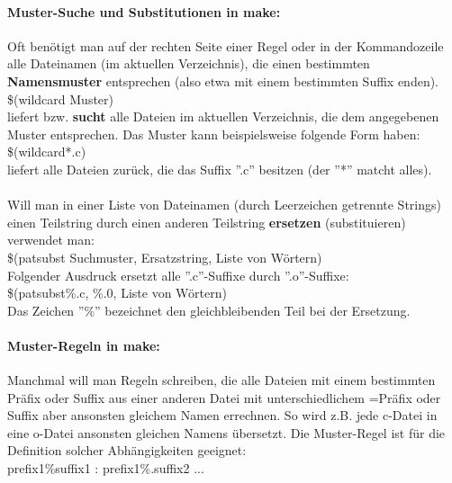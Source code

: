 \paragraph{Muster-Suche und Substitutionen in make:}
Oft benötigt man auf der rechten Seite einer Regel oder in der Kommandozeile alle Dateinamen (im aktuellen Verzeichnis), die einen bestimmten \textbf{Namensmuster} entsprechen (also etwa mit einem bestimmten Suffix enden). \\
\$(wildcard Muster) \\
liefert bzw. \textbf{sucht} alle Dateien im aktuellen Verzeichnis, die dem angegebenen Muster entsprechen. Das Muster kann beispielsweise folgende Form haben: \\
\$(wildcard*.c) \\
liefert alle Dateien zurück, die das Suffix ''.c'' besitzen (der ''*'' matcht alles). 
\\
\\
Will man in einer Liste von Dateinamen (durch Leerzeichen getrennte Strings) einen Teilstring durch einen anderen Teilstring \textbf{ersetzen} (substituieren) verwendet man: \\
\$(patsubst Suchmuster, Ersatzstring, Liste von Wörtern) \\
Folgender Ausdruck ersetzt alle ''.c''-Suffixe durch ''.o''-Suffixe: \\
\$(patsubst\%.c, \%.0, Liste von Wörtern) \\
Das Zeichen ''\%'' bezeichnet den gleichbleibenden Teil bei der Ersetzung.

\paragraph{Muster-Regeln in make:}
Manchmal will man Regeln schreiben, die alle Dateien mit einem bestimmten Präfix oder Suffix aus einer anderen Datei mit unterschiedlichem =Präfix oder Suffix aber ansonsten gleichem Namen errechnen. So wird z.B. jede c-Datei in eine o-Datei ansonsten gleichen Namens übersetzt. Die Muster-Regel ist für die Definition solcher Abhängigkeiten geeignet: \\
prefix1\%suffix1 : prefix1\%.suffix2 ...


